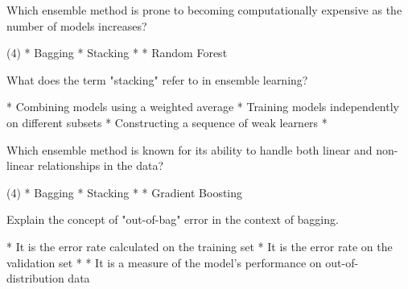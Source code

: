 \documentclass[10pt]{extarticle}
\begin{document}
\begin{exercise}
    Which ensemble method is prone to becoming computationally expensive as the number of models increases?
    \begin{choice} (4)
        * Bagging
        * Stacking
        * 
        * Random Forest
    \end{choice}
\end{exercise}
\begin{solution}
\end{solution}

\begin{exercise}
    What does the term "stacking" refer to in ensemble learning?
    \begin{choice}
        * Combining models using a weighted average
        * Training models independently on different subsets
        * Constructing a sequence of weak learners
        * 
    \end{choice}
\end{exercise}
\begin{solution}
\end{solution}

\begin{exercise}
    Which ensemble method is known for its ability to handle both linear and non-linear relationships in the data?
    \begin{choice}(4)
        * Bagging
        * Stacking
        * 
        * Gradient Boosting
    \end{choice}
\end{exercise}
\begin{solution}
\end{solution}

\begin{exercise}
    Explain the concept of "out-of-bag" error in the context of bagging.
    \begin{choice}
        * It is the error rate calculated on the training set
        * It is the error rate on the validation set
        * 
        * It is a measure of the model's performance on out-of-distribution data
    \end{choice}
\end{exercise}
\begin{solution}
\end{solution}
\end{document}
